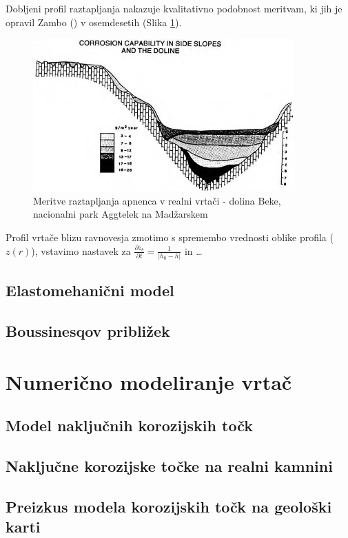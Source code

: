 \documentclass[a4paper, oneside, 12pt]{book}
\begin{document}
Dobljeni profil raztapljanja nakazuje kvalitativno podobnost meritvam, ki jih je opravil Zambo (\cite{Zambo1997}) v osemdesetih (Slika \ref{fig:vrtaca-aggtelek}).

\begin{figure}[H]
  \begin{center}
    \includegraphics[width=10cm]{slike/vrtaca-aggtelek}
  \end{center}
  \caption{Meritve raztapljanja apnenca v realni vrtači - dolina Beke, nacionalni park Aggtelek na Madžarskem \cite{Zambo1997}}
  \label{fig:vrtaca-aggtelek}
\end{figure}

Profil vrtače blizu ravnovesja zmotimo s spremembo vrednosti oblike profila ($z(r)$), vstavimo nastavek za $\frac{\partial z_b}{\partial t}=\frac{1}{|h_0-h|}$ in \dots

\section{Elastomehanični model}
\section{Boussinesqov približek}


\chapter{Numerično modeliranje vrtač} 
\label{ch4}

\section{Model naključnih korozijskih točk}
\section{Naključne korozijske točke na realni kamnini}
\section{Preizkus modela korozijskih točk na geološki karti}

\nocite{*}
\newpage
{}

\end{document}

